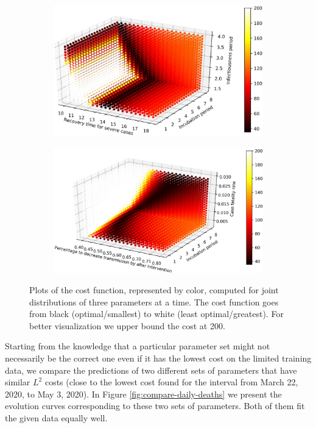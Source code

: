 \documentclass[11pt]{article}
\begin{document}
\begin{figure}[H]
    \begin{subfigure}{0.49\textwidth}
        \centering
        \includegraphics[width=\linewidth]{figs/30-04-2020/2020-5-3_D_recovery_severe_D_incbation_D_infectious.pdf}
    \end{subfigure}
    \hfill
    \begin{subfigure}{0.49\textwidth}
        \centering
        \includegraphics[width=\linewidth]{figs/30-04-2020/2020-5-3_OMInterventionAmt_D_incbation_CFR.pdf}
    \end{subfigure}
    
    \caption{Plots of the cost function, represented by color, computed for joint distributions of three parameters at a time. The cost function goes from black (optimal/smallest) to white (least optimal/greatest). For better visualization we upper bound the cost at 200.}
    \label{fig:optimality}
\end{figure}

Starting from the knowledge that a particular parameter set might not necessarily be the correct one even if it has the lowest cost on the limited training data, we compare the predictions of two different sets of parameters that have similar $L^2$ costs 
(close to the lowest cost found for the interval from March 22, 2020, to May 3, 2020). In Figure \ref{fig:compare-daily-deaths} we present the evolution curves corresponding to these two sets of parameters. Both of them fit the given data equally well.
\end{document}
